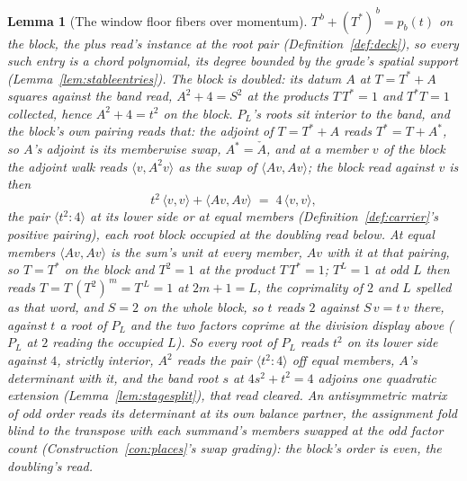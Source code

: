\documentclass[11pt]{article}
\newtheorem{lemma}{Lemma}
\theoremstyle{definition}
\begin{document}
\begin{lemma}[The window floor fibers over momentum]
$T^{\,b}+(T^{*})^{\,b}=p_b(t)$ on the block, the plus read's
instance at the root pair (Definition~\ref{def:deck}), so every such
entry is a chord polynomial, its degree bounded by the grade's
spatial support (Lemma~\ref{lem:stableentries}). The block is \emph{doubled}: its
datum $A$ at $T=T^{*}+A$ squares against the band read,
$A^2+4=S^2$ at the products $T\,T^{*}=1$ and
$T^{*}T=1$ collected, hence
$A^2+4=t^2$ on the block. $P_L$'s roots sit interior to the band, and
the block's own pairing reads that: the adjoint of $T=T^{*}+A$ reads
$T^{*}=T+A^{*}$, so $A$'s adjoint is its
memberwise swap, $A^{*}=\check A$, and at a member $v$ of the
block the adjoint walk reads $\langle v,A^2v\rangle$ as the swap of
$\langle Av,Av\rangle$; the block read against $v$ is then
\[
t^2\,\langle v,v\rangle+\langle Av,Av\rangle
\;=\;4\,\langle v,v\rangle ,
\]
the pair $\langle t^2\!:\!4\rangle$ at its lower side or at equal
members (Definition~\ref{def:carrier}'s positive pairing), each root
block occupied at the doubling read below. At equal members
$\langle Av,Av\rangle$ is the sum's unit at every member, $Av$ with it
at that pairing, so $T=T^{*}$ on the block and $T^2=1$ at the
product $T\,T^{*}=1$; $T^L=1$ at odd $L$ then reads
$T=T\,(T^2)^{\,m}=T^{\,L}=1$ at $2m+1=L$, the coprimality of $2$ and
$L$ spelled as that word, and $S=2$ on the whole block, so $t$ reads
$2$ against $S\,v=t\,v$ there, against $t$ a root of $P_L$ and the
two factors coprime at the division display above ($P_L$ at $2$
reading the occupied $L$). So every root of $P_L$ reads $t^2$ on its
lower side against $4$, strictly interior, $A^2$ reads the pair
$\langle t^2\!:\!4\rangle$ off equal members, $A$'s determinant with
it, and the \emph{band root} $s$ at $4s^2+t^2=4$ adjoins one
quadratic extension (Lemma~\ref{lem:stagesplit}), that read cleared.
An antisymmetric matrix of odd order reads its determinant at its own
balance partner, the assignment fold blind to the transpose with each
summand's members swapped at the odd factor count
(Construction~\ref{con:places}'s swap grading): the block's order is
even, the doubling's read.


\end{lemma}
\end{document}
